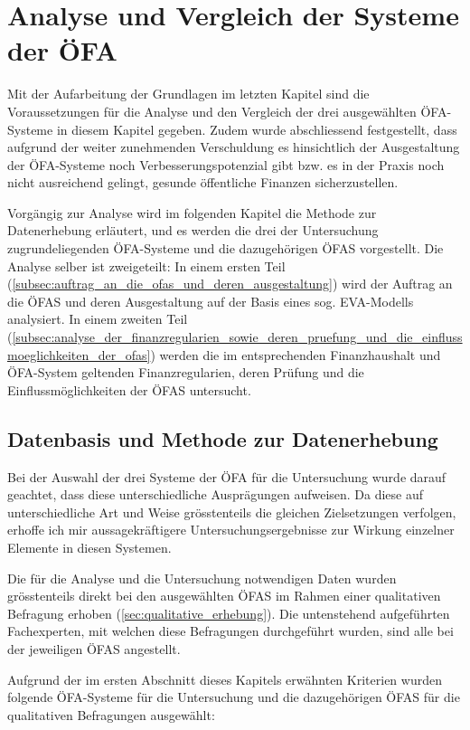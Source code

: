 \documentclass[10pt]{article}
\begin{document}
\newpage
\section{Analyse und Vergleich der Systeme der ÖFA}\label{sec:analyse_und_vergleich_der_systeme_der_ofa}
Mit der Aufarbeitung der Grundlagen im letzten Kapitel sind die Voraussetzungen für die Analyse und den Vergleich der drei ausgewählten ÖFA-Systeme in diesem Kapitel gegeben. Zudem wurde abschliessend festgestellt, dass aufgrund der weiter zunehmenden Verschuldung es hinsichtlich der Ausgestaltung der ÖFA-Systeme noch Verbesserungs­potenzial gibt bzw. es in der Praxis noch nicht ausreichend gelingt, gesunde öffentliche Finanzen sicherzustellen.

Vorgängig zur Analyse wird im folgenden Kapitel die Methode zur Datenerhebung erläutert, und es werden die drei der Untersuchung zugrundeliegenden ÖFA-Systeme und die dazugehörigen ÖFAS vorge­stellt. Die Analyse selber ist zweigeteilt: In einem ersten Teil (\vref{subsec:auftrag_an_die_ofas_und_deren_ausgestaltung}) wird der Auftrag an die ÖFAS und deren Ausgestaltung auf der Basis eines sog. EVA-Modells analysiert. In einem zweiten Teil (\vref{subsec:analyse_der_finanzregularien_sowie_deren_pruefung_und_die_einflussmoeglichkeiten_der_ofas}) werden die im entsprechenden Finanzhaushalt und ÖFA-System geltenden Finanz­regularien, deren Prüfung und die Einflussmöglichkeiten der ÖFAS untersucht.

\subsection{Datenbasis und Methode zur Datenerhebung}\label{subsec:datenbasis_und_methode_zur_datenerhebung}
Bei der Auswahl der drei Systeme der ÖFA für die Untersuchung wurde darauf geachtet, dass diese unterschiedliche Ausprägungen aufweisen. Da diese auf unterschiedliche Art und Weise grösstenteils die gleichen Zielsetzungen verfolgen, erhoffe ich mir aussagekräftigere Untersuchungsergebnisse zur Wirkung einzelner Elemente in diesen Systemen. 

Die für die Analyse und die Untersuchung notwendigen Daten wurden grösstenteils direkt bei den ausgewählten ÖFAS im Rahmen einer qualitativen Befragung erhoben (\vref{sec:qualitative_erhebung}). Die untenstehend aufgeführten Fachexperten, mit welchen diese Befragungen durchgeführt wurden, sind alle bei der jeweiligen ÖFAS angestellt. 

Aufgrund der im ersten Abschnitt dieses Kapitels erwähnten Kriterien wurden folgende ÖFA-Systeme für die Untersuchung und die dazugehörigen ÖFAS für die qualitativen Befragungen ausgewählt:
\end{document}
